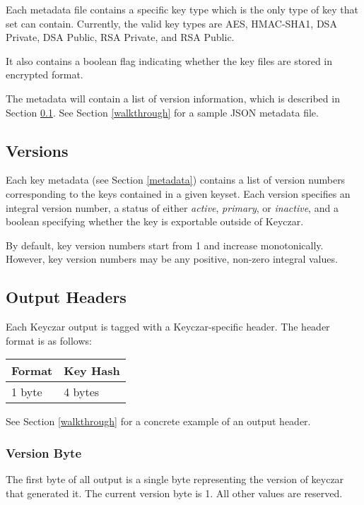 \documentclass{llncs}
\begin{document}
Each metadata file contains a specific key type which is the only type of key
that set can contain. Currently, the valid key types are AES, HMAC-SHA1, DSA
Private, DSA Public, RSA Private, and RSA Public.

It also contains a boolean flag indicating whether the key files are stored in
encrypted format.

The metadata will contain a list of version information, which is
described in Section \ref{versions}. See Section \ref{walkthrough} for a sample
JSON metadata file.

\subsection{Versions}\label{versions}

Each key metadata (see Section \ref{metadata}) contains a list of version
numbers corresponding to the keys contained in a given keyset. Each version
specifies an integral version number, a status of either {\it active}, {\it
primary}, or {\it inactive}, and a boolean specifying whether
the key is exportable outside of Keyczar.

By default, key version numbers start from 1 and increase monotonically.
However, key version numbers may be any positive, non-zero integral values.

\subsection{Output Headers} \label{header}

Each Keyczar output is tagged with a Keyczar-specific header. The header format
is as follows:

\vspace*{3mm}
\begin{tabular}{| l | l |}
\hline
Format & Key Hash \\ \hline
1 byte & 4 bytes \\ \hline
\end{tabular}
\vspace*{3mm}

See Section \ref{walkthrough} for a concrete example of an output header.

\subsubsection{Version Byte}

The first byte of all output is a single byte representing the version of
keyczar that generated it. The current version byte is 1. All other values are
reserved.
\end{document}

